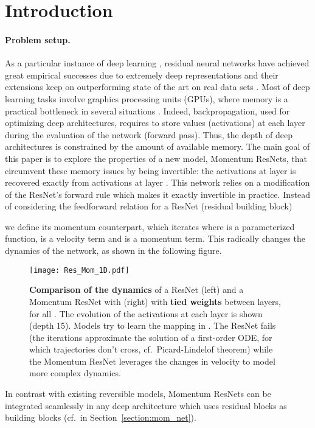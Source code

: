 \documentclass{article}
\begin{document}
\vspace{-1em}
\section{Introduction}
\label{submission}

\paragraph{Problem setup.}

As a particular instance of deep learning \citep{cite-key,Goodfellow-et-al-2016}, residual neural networks \citep[ResNets]{he2015deep} have achieved great empirical successes due to extremely deep representations and their extensions keep on outperforming state of the art on real data sets \citep{alex2019big,touvron2020fixing}.
Most of deep learning tasks involve graphics processing units (GPUs), where memory is a practical bottleneck in several situations \citep{wang2018superneurons,peng2017large,zhu2017unpaired}.
Indeed, backpropagation, used for optimizing deep architectures, requires to store values (activations) at each layer during the evaluation of the network (forward pass). Thus, the depth of deep architectures is constrained by the amount of available memory. The main goal of this paper is to explore the properties of a new model, Momentum ResNets, that circumvent these memory issues by being invertible: the activations at layer  is recovered exactly from activations at layer .
This network relies on a modification of the ResNet's forward rule which makes it exactly invertible in practice. 
Instead of considering the feedforward relation for a ResNet (residual building block)

we define its momentum counterpart, which iterates 
where  is a parameterized function,  is a velocity term and  is a momentum term. This radically changes the dynamics of the network, as shown in the following figure.
\begin{figure}[H]
\centering
\texttt{[image: Res\_Mom\_1D.pdf]} 
\caption{\textbf{Comparison of the dynamics} of a ResNet (left) and a Momentum ResNet with  (right) with \textbf{tied weights} between layers,  for all . The evolution of the activations at each layer is shown (depth 15). Models try to learn the mapping  in . The ResNet fails (the iterations approximate the solution of a first-order ODE, for which trajectories don’t cross, cf.\ Picard-Lindelof theorem)
while the Momentum ResNet leverages the changes in velocity to model more complex dynamics.}\label{fig:Res_Mom}
\vspace{-1em}
\end{figure}
In contrast with existing reversible models, Momentum ResNets can be integrated seamlessly in any deep architecture which uses residual blocks as building blocks (cf.\ in Section~\ref{section:mom_net}).
\vspace{-1em}
\end{document}

